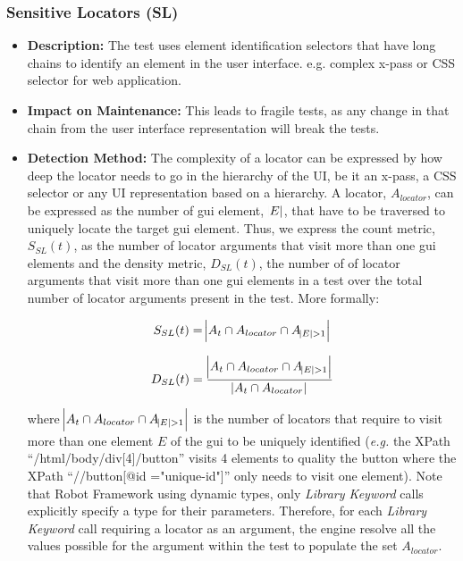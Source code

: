 \subsubsection{Sensitive Locators (SL)}

\begin{itemize}
    \item \textbf{Description:} The test uses element identification selectors that have long chains to identify an element in the user interface. e.g. complex x-pass or CSS selector for web application.

    \item \textbf{Impact on Maintenance:} This leads to fragile tests, as any change in that chain from the user interface representation will break the tests.
    
    \item \textbf{Detection Method:} The complexity of a locator can be expressed by how deep the locator needs to go in the hierarchy of the UI, be it an x-pass, a CSS selector or any UI representation based on a hierarchy. A locator, $A_{locator}$, can be expressed as the number of \gls{gui} element, $\abs{E}$, that have to be traversed to uniquely locate the target \gls{gui} element. Thus, we express the count metric, $S_{SL}(t)$, as the number of locator arguments that visit more than one \gls{gui} elements and the density metric, $D_{SL}(t)$, the number of of locator arguments that visit more than one \gls{gui} elements in a test over the total number of locator arguments present in the test. More formally:
    
    \begin{equation*}
        S_{SL}(t) = \abs{A_t \cap A_{locator} \cap A_{\abs{E} > 1}}
    \end{equation*}
    
    \begin{equation*}
        D_{SL}(t) = \frac{\abs{A_t \cap A_{locator} \cap A_{\abs{E} > 1}}}{\abs{A_t \cap A_{locator}}}
    \end{equation*}
    
    where $\abs{A_t \cap A_{locator} \cap A_{\abs{E} > 1}}$ is the number of locators that require to visit more than one element $E$ of the \gls{gui} to be uniquely identified (\emph{e.g.} the XPath ``/html/body/div[4]/button'' visits 4 elements to quality the button where the XPath ``//button[@id ="unique-id"]'' only needs to visit one element). Note that Robot Framework using dynamic types, only \emph{Library Keyword} calls explicitly specify a type for their parameters. Therefore, for each \emph{Library Keyword} call requiring a locator as an argument, the engine resolve all the values possible for the argument within the test to populate the set $A_{locator}$.
    

\end{itemize}
